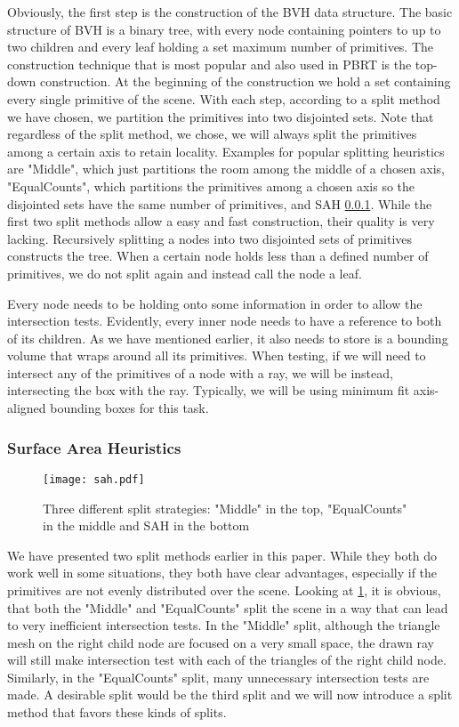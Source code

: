 Obviously, the first step is the construction of the BVH data structure. The basic structure of BVH is a binary tree, with every node containing pointers to up to two children and every leaf holding a set maximum number of primitives. The construction technique that is most popular and also used in PBRT is the top-down construction. At the beginning of the construction we hold a set containing every single primitive of the scene. With each step, according to a split method we have chosen, we partition the primitives into two disjointed sets. Note that regardless of the split method, we chose, we will always split the primitives among a certain axis to retain locality. Examples for popular splitting heuristics are "Middle", which just partitions the room among the middle of a chosen axis, "EqualCounts", which partitions the primitives among a chosen axis so the disjointed sets have the same number of primitives, and SAH \ref{pre:sah}. While the first two split methods allow a easy and fast construction, their quality is very lacking. Recursively splitting a nodes into two disjointed sets of primitives constructs the tree. When a certain node holds less than a defined number of primitives, we do not split again and instead call the node a leaf.

Every node needs to be holding onto some information in order to allow the intersection tests. Evidently, every inner node needs to have a reference to both of its children. As we have mentioned earlier, it also needs to store is a bounding volume that wraps around all its primitives. When testing, if we will need to intersect any of the primitives of a node with a ray, we will be instead, intersecting the box with the ray. Typically, we will be using minimum fit axis-aligned bounding boxes for this task.

\subsubsection{Surface Area Heuristics}
\label{pre:sah}

\begin{figure}
	\begin{center}
		\texttt{[image: sah.pdf]}
		\caption{Three different split strategies: "Middle" in the top, "EqualCounts" in the middle and SAH in the bottom}
		\label{fig:sah}
	\end{center}
\end{figure}


We have presented two split methods earlier in this paper. While they both do work well in some situations, they both have clear advantages, especially if the primitives are not evenly distributed over the scene. Looking at \ref{fig:sah}, it is obvious, that both the "Middle" and "EqualCounts" split the scene in a way that can lead to very inefficient intersection tests. In the "Middle" split, although the triangle mesh on the right child node are focused on a very small space, the drawn ray will still make intersection test with each of the triangles of the right child node. Similarly, in the "EqualCounts" split, many unnecessary intersection tests are made. A desirable split would be the third split and we will now introduce a split method that favors these kinds of splits.

